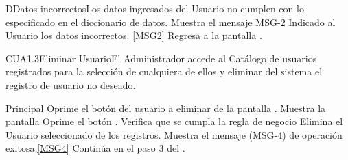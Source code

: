 		 \begin{UCtrayectoriaA}{D}{Datos incorrectos}{Los datos ingresados del Usuario no cumplen con lo especificado en el diccionario de datos.}
			\UCpaso Muestra el mensaje MSG-2 Indicado al Usuario los datos incorrectos. \ref{MSG2}
			\UCpaso Regresa a la pantalla .
		\end{UCtrayectoriaA}


	\begin{UseCase}{CUA1.3}{Eliminar Usuario}{El Administrador accede al Catálogo de usuarios registrados para la selección de cualquiera de ellos y  eliminar del sistema el registro de usuario no deseado.}
	\end{UseCase}

	\begin{UCtrayectoria}{Principal}
			\UCpaso[\UCactor] Oprime el botón  del usuario a eliminar de la pantalla .
			\UCpaso Muestra la pantalla 
			\UCpaso [\UCactor] Oprime el botón .
			\UCpaso Verifica que se cumpla la regla de negocio  
			\UCpaso Elimina el Usuario seleccionado de los registros.
			\UCpaso Muestra el mensaje (MSG-4) de operación exitosa.\ref{MSG4}
			\UCpaso Continúa en el paso 3 del .
	\end{UCtrayectoria}

